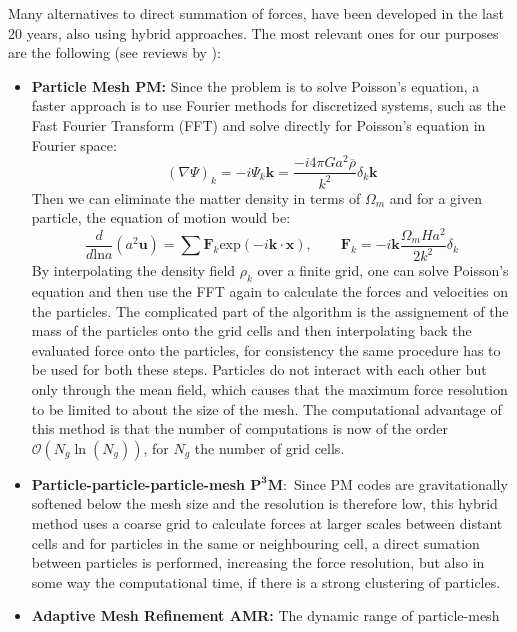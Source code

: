 Many alternatives to direct summation of forces, have been developed
in the last 20 years, also using hybrid approaches. The most relevant
ones for our purposes are the following (see reviews by \citet{trenti_gravitational_2008,dehnen_n-body_2011,kuhlen_numerical_2012}):
\begin{itemize}
\item \textbf{Particle Mesh PM: }Since the problem is to solve Poisson's
equation, a faster approach is to use Fourier methods for discretized
systems, such as the Fast Fourier Transform (FFT)
 and solve directly for Poisson's equation in Fourier space: 
\begin{equation}
(\nabla\Psi)_{k}=-i\Psi_{k}\mathbf{k}=\frac{-i4\pi Ga^{2}\overline{\rho}}{k^{2}}\delta_{k}\mathbf{k}
\end{equation}
Then we can eliminate the matter density in terms of $\Omega_{m}$
and for a given particle, the equation of motion would be: 
\begin{equation}
\frac{d}{d\mbox{ln}a}(a^{2}\mathbf{u})=\sum\mathbf{F}_{k}\mbox{exp}(-i\mathbf{k}\cdot\mathbf{x}),\qquad\mathbf{F}_{k}=-i\mathbf{k}\frac{\Omega_{m}Ha^{2}}{2k^{2}}\delta_{k}
\end{equation}
By interpolating the density field $\rho_{k}$ over a finite grid,
one can solve Poisson's equation and then use the FFT again to calculate
the forces and velocities on the particles. The complicated part of
the algorithm is the assignement of the mass of the particles onto
the grid cells and then interpolating back the evaluated force onto
the particles, for consistency the same procedure has to be used for
both these steps. Particles do not interact with each other but only
through the mean field, which causes that the maximum force resolution
to be limited to about the size of the mesh. The computational advantage
of this method is that the number of computations is now of the order
$\mathcal{O}(N_{g}\ln(N_{g}))$, for $N_{g}$ the number of grid cells.
\item \textbf{Particle-particle-particle-mesh $\mathbf{P^{3}M}:$ }Since
PM codes are gravitationally softened below the mesh size and the
resolution is therefore low, this hybrid method uses a coarse grid
to calculate forces at larger scales between distant cells and for
particles in the same or neighbouring cell, a direct sumation between
particles is performed, increasing the force resolution, but also
in some way the computational time, if there is a strong clustering
of particles.
\item \textbf{Adaptive Mesh Refinement AMR: }The dynamic range of particle-mesh

\end{itemize}
